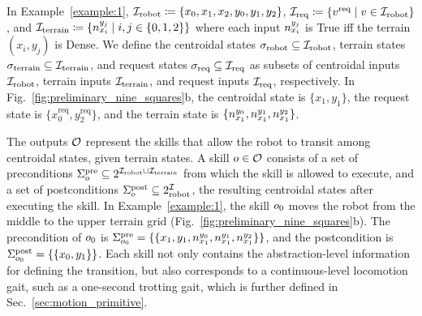 \documentclass[letterpaper, 10 pt, conference]{ieeeconf}
\begin{document}
%
In Example~\ref{example:1},
${\mathcal I}_{\textrm{robot}} \coloneqq \{x_0, x_1, x_2, y_0, y_1, y_2\}$,
${\mathcal I}_{\textrm{req}} \coloneqq \{v^\textrm{req} \mid v \in {\mathcal I}_{\textrm{robot}}\}$,
and
${\mathcal I}_{\textrm{terrain}} \coloneqq \{n_{x_i}^{y_j} \mid i,j\in \{0, 1, 2\}\}$
where each input $n_{x_i}^{y_j}$ is True iff the terrain $(x_i, y_j)$ is Dense.
%
We define 
the
centroidal states $\sigma_{\textrm{robot}} \subseteq {\mathcal I}_{\textrm{robot}}$, 
terrain states $\sigma_{\textrm{terrain}} \subseteq {\mathcal I}_{\textrm{terrain}}$, 
and request states
$\sigma_{\textrm{req}} \subseteq {\mathcal I}_{\textrm{req}}$
as
subsets of 
centroidal inputs ${\mathcal I}_{\textrm{robot}}$, 
terrain inputs ${\mathcal I}_{\textrm{terrain}}$, 
and request inputs ${\mathcal I}_{\textrm{req}}$,
respectively.
%
%
In Fig.~\ref{fig:preliminary_nine_squares}b,
the centroidal state is $\{x_1, y_1\}$,
the request state is $\{x_0^{\textrm{req}}, y_2^{\textrm{req}}\}$,
and the terrain state is $\{n_{x_1}^{y_0}, n_{x_1}^{y_1}, n_{x_1}^{y_2}\}$.


The outputs
${\mathcal O}$ 
represent
the skills 
that allow the robot to transit among centroidal states,
given terrain states.
A skill $o \in {\mathcal O}$
consists of 
a set of preconditions $\Sigma_{o}^{\textrm{pre}} \subseteq 2^{{\mathcal I}_{\textrm{robot}} \cup {\mathcal I}_{\textrm{terrain}}}$
from which the skill is allowed to execute,
and a set of postconditions $\Sigma_{o}^{\textrm{post}} \subseteq 2^{\mathcal I}_{\textrm{robot}}$, the resulting centroidal states after executing the skill.
%
In Example~\ref{example:1},
the skill $o_{0}$ moves the robot from the middle to the upper terrain grid (Fig.~\ref{fig:preliminary_nine_squares}b).
The precondition of $o_{0}$ is
$\Sigma_{o_{0}}^{\textrm{pre}} = \{\{x_1, y_1, n_{x_1}^{y_0}, n_{x_1}^{y_1}, n_{x_1}^{y_2}\}\}$, and
the postcondition is
$\Sigma_{o_{0}}^{\textrm{post}} = \{\{x_0, y_1\}\}$.
Each skill not only contains the abstraction-level information for defining the transition, but also corresponds to a continuous-level locomotion gait, such as a one-second trotting gait, which is further defined in Sec.~\ref{sec:motion_primitive}. 
\end{document}
